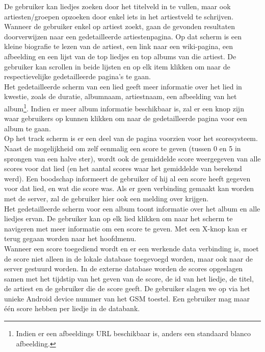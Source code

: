 \documentclass[11pt,a4paper]{article}
\begin{document}
De gebruiker kan liedjes zoeken door het titelveld in te vullen, maar ook artiesten/groepen opzoeken door enkel iets in het artiestveld te schrijven. Wanneer de gebruiker enkel op artiest zoekt, gaan de gevonden resultaten doorverwijzen naar een gedetailleerde artiestenpagina. Op dat scherm is een kleine biografie te lezen van de artiest, een link naar een wiki-pagina, een afbeelding en een lijst van de top liedjes en top albums van die artiest. De gebruiker kan scrollen in beide lijsten en op elk item klikken om naar de respectievelijke gedetailleerde pagina's te gaan.
\\

Het gedetailleerde scherm van een lied geeft meer informatie over het lied in kwestie, zoals de duratie, albumnaam, artiestnaam, een afbeelding van het album\footnote{Indien er een afbeeldings URL beschikbaar is, anders een standaard blanco afbeelding.}. Indien er meer album informatie beschikbaar is, zal er een knop zijn waar gebruikers op kunnen klikken om naar de gedetailleerde pagina voor een album te gaan. 
\\ 	

Op het track scherm is er een deel van de pagina voorzien voor het scoresysteem. Naast de mogelijkheid om zelf eenmalig een score te geven (tussen 0 en 5 in sprongen van een halve ster), wordt ook de gemiddelde score weergegeven van alle scores voor dat lied (en het aantal scores waar het gemiddelde van berekend werd). Een boodschap informeert de gebruiker of hij al een score heeft gegeven voor dat lied, en wat die score was. Als er geen verbinding gemaakt kan worden met de server, zal de gebruiker hier ook een melding over krijgen. 
\\ 
	
Het gedetailleerde scherm voor een album toont informatie over het album en alle liedjes ervan. De gebruiker kan op elk lied klikken om naar het scherm te navigeren met meer informatie om een score te geven. Met een X-knop kan er terug gegaan worden naar het hoofdmenu.
\\ 
	
Wanneer een score toegediend wordt en er een werkende data verbinding is, moet de score niet alleen in de lokale database toegevoegd worden, maar ook naar de server gestuurd worden. In de externe database worden de scores opgeslagen samen met het tijdstip van het geven van de score, de id van het liedje, de titel, de artiest en de gebruiker die de score geeft. De gebruiker slagen we op via het unieke Android device nummer van het GSM toestel. Een gebruiker mag maar één score hebben per liedje in de databank.
\\
\end{document}
